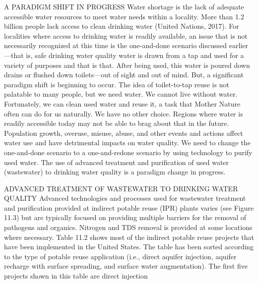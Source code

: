 \documentclass{article}
\begin{document}
A PARADIGM SHIFT IN PROGRESS Water shortage is the lack of adequate
accessible water resources to meet water needs within a locality. More
than 1.2 billion people lack access to clean drinking water (United
Nations, 2017). For localities where access to drinking water is readily
available, an issue that is not necessarily recognized at this time is
the one-and-done scenario discussed earlier---that is, safe drinking
water quality water is drawn from a tap and used for a variety of
purposes and that is that. After being used, this water is poured down
drains or flushed down toilets---out of sight and out of mind. But, a
significant paradigm shift is beginning to occur. The idea of
toilet-to-tap reuse is not palatable to many people, but we need water.
We cannot live without water. Fortunately, we can clean used water and
reuse it, a task that Mother Nature often can do for us naturally. We
have no other choice. Regions where water is readily accessible today
may not be able to brag about that in the future. Population growth,
overuse, misuse, abuse, and other events and actions affect water use
and have detrimental impacts on water quality. We need to change the
one-and-done scenario to a one-and-redone scenario by using technology
to purify used water. The use of advanced treatment and purification of
used water (wastewater) to drinking water quality is a paradigm change
in progress.

ADVANCED TREATMENT OF WASTEWATER TO DRINKING WATER QUALITY Advanced
technologies and processes used for wastewater treatment and
purification provided at indirect potable reuse (IPR) plants varies (see
Figure 11.3) but are typically focused on providing multiple barriers
for the removal of pathogens and organics. Nitrogen and TDS removal is
provided at some locations where necessary. Table 11.2 shows most of the
indirect potable reuse projects that have been implemented in the United
States. The table has been sorted according to the type of potable reuse
application (i.e., direct aquifer injection, aquifer recharge with
surface spreading, and surface water augmentation). The first five
projects shown in this table are direct injection
\end{document}

